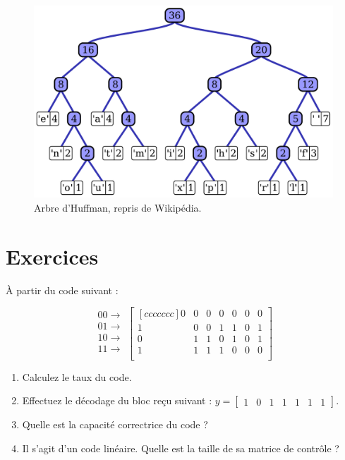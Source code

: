\documentclass [a4paper, 11pt] {article}
\begin{document}
    \begin{figure}[H]
        \centering
        \includegraphics[width=.5\textwidth]{imgs/Huffman_tree_2.pdf}
        \caption{Arbre d'Huffman, repris de Wikipédia.}
        \label{fig:huffman}
        \vspace{-2cm}
    \end{figure}
    
    \pagebreak
    \pagestyle{nextpages}
    
    
    
    \pagebreak
    \part*{Exercices}
    
    \begin{exercice}{1}
        
        À partir du code suivant :
        
        \begin{equation*}
            \begin{matrix}
                00 \rightarrow \\
                01 \rightarrow\\
                10 \rightarrow\\
                11 \rightarrow\\
            \end{matrix}
            \begin{bmatrix}[ccccccc]
               0 & 0 & 0 & 0 & 0 & 0 & 0 \\
               1 & 0 & 0 & 1 & 1 & 0 & 1\\
               0 & 1 & 1 & 0 & 1 & 0 & 1\\
               1 & 1 & 1 & 1 & 0 & 0 & 0\\
            \end{bmatrix}
        \end{equation*}
      
        \begin{enumerate}
            \item Calculez le taux du code.
            \item Effectuez le décodage du bloc reçu suivant : $y = \begin{bmatrix}
               1 & 0 & 1 & 1 & 1 & 1 & 1
            \end{bmatrix}$.
            \item Quelle est la capacité correctrice du code ?
            \item Il s'agit d'un code linéaire. Quelle est la taille de sa matrice de contrôle ?
        \end{enumerate} 
    \end{exercice}
    
\end{document}
